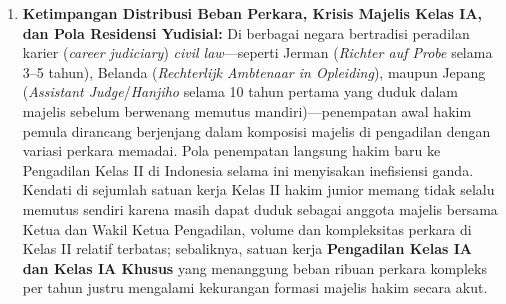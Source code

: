\documentclass[12pt,a4paper,twocolumn]{article}
\begin{document}
\begin{enumerate}
    \item \textbf{Ketimpangan Distribusi Beban Perkara, Krisis Majelis Kelas IA, dan Pola Residensi Yudisial:} Di berbagai negara bertradisi peradilan karier (\textit{career judiciary}) \textit{civil law}—seperti Jerman (\textit{Richter auf Probe} selama 3--5 tahun), Belanda (\textit{Rechterlijk Ambtenaar in Opleiding}), maupun Jepang (\textit{Assistant Judge}/\textit{Hanjiho} selama 10 tahun pertama yang duduk dalam majelis sebelum berwenang memutus mandiri)—penempatan awal hakim pemula dirancang berjenjang dalam komposisi majelis di pengadilan dengan variasi perkara memadai. Pola penempatan langsung hakim baru ke Pengadilan Kelas II di Indonesia selama ini menyisakan inefisiensi ganda. Kendati di sejumlah satuan kerja Kelas II hakim junior memang tidak selalu memutus sendiri karena masih dapat duduk sebagai anggota majelis bersama Ketua dan Wakil Ketua Pengadilan, volume dan kompleksitas perkara di Kelas II relatif terbatas; sebaliknya, satuan kerja \textbf{Pengadilan Kelas IA dan Kelas IA Khusus} yang menanggung beban ribuan perkara kompleks per tahun justru mengalami kekurangan formasi majelis hakim secara akut.


\end{enumerate}
\end{document}
